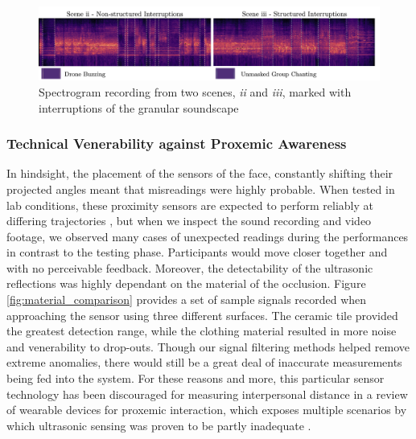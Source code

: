 \begin{figure}[!ht]
\centering
\includegraphics[width=\textwidth,keepaspectratio]{Chapters/Figures/adse_ess/interuptions-spectogram-markings-fig.png}
{\caption[Spectrogram recording from two scenes, \textit{ii} and \textit{iii}]{Spectrogram recording from two scenes, \textit{ii} and \textit{iii}, marked with interruptions of the granular soundscape}
\label{fig:interuptions-spectogram}}
\end{figure} 

\subsubsection{Technical Venerability against Proxemic Awareness}
\label{subsec:accuracy}

In hindsight, the placement of the sensors of the face, constantly shifting their projected angles meant that misreadings were highly probable. When tested in lab conditions, these proximity sensors are expected to perform reliably at differing trajectories \citep{abreu_low-cost_2021}, but when we inspect the sound recording and video footage, we observed many cases of unexpected readings during the performances in contrast to the testing phase. Participants would move closer together and with no perceivable feedback. Moreover, the detectability of the ultrasonic reflections was highly dependant on the material of the occlusion. Figure \ref{fig:material_comparison} provides a set of sample signals recorded when approaching the sensor using three different surfaces. The ceramic tile provided the greatest detection range, while the clothing material resulted in more noise and venerability to drop-outs. Though our signal filtering methods helped remove extreme anomalies, there would still be a great deal of inaccurate measurements being fed into the system. For these reasons and more, this particular sensor technology has been discouraged for measuring interpersonal distance in a review of wearable devices for proxemic interaction, which exposes multiple scenarios by which ultrasonic sensing was proven to be partly inadequate \citep{montanari_measuring_2018}. 

